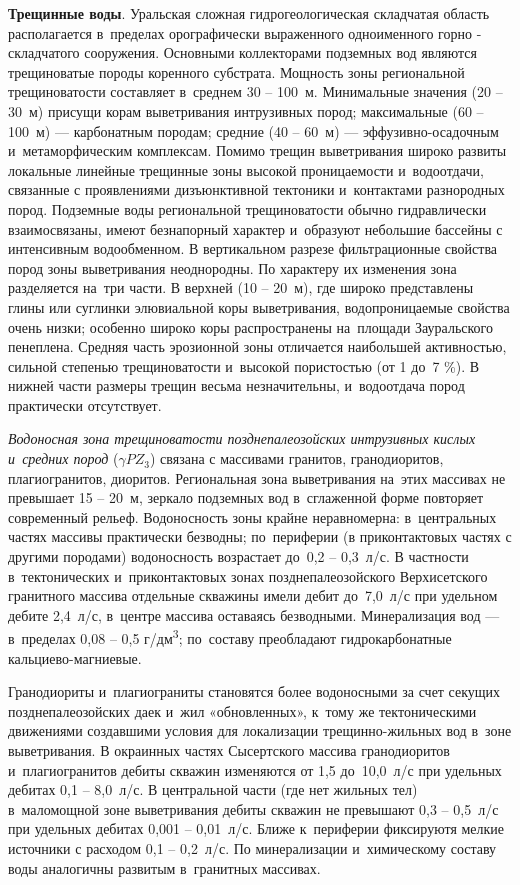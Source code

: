\textbf{Трещинные воды}. Уральская сложная гидрогеологическая складчатая область располагается в~пределах орографически выраженного одноименного горно - складчатого сооружения. Основными коллекторами подземных вод являются трещиноватые породы коренного субстрата. Мощность зоны региональной трещиноватости составляет в~среднем 30  --  100~м. Минимальные значения (20  --  30~м) присущи корам выветривания интрузивных пород; максимальные (60  --  100~м)  ---  карбонатным породам; средние (40  --  60~м)  ---  эффузивно-осадочным и~метаморфическим комплексам. Помимо трещин выветривания широко развиты локальные линейные трещинные зоны высокой проницаемости и~водоотдачи, связанные с проявлениями дизъюнктивной тектоники и~контактами разнородных пород. Подземные воды региональной трещиноватости обычно гидравлически взаимосвязаны, имеют безнапорный характер и~образуют небольшие бассейны с интенсивным
водообменном. В вертикальном разрезе фильтрационные свойства пород зоны выветривания неоднородны. По характеру их изменения зона разделяется на~три части. В верхней (10  --  20~м), где широко представлены глины или суглинки элювиальной коры выветривания, водопроницаемые свойства очень низки; особенно широко коры распространены на~площади Зауральского пенеплена. Средняя часть эрозионной зоны отличается наибольшей активностью, сильной степенью трещиноватости и~высокой пористостью (от 1 до~7 \%). В нижней части размеры трещин весьма незначительны, и~водоотдача пород практически отсутствует.

\textit{Водоносная зона трещиноватости позднепалеозойских интрузивных кислых и~средних пород} ($\gamma PZ_3$) связана с массивами гранитов, гранодиоритов, плагиогранитов, диоритов. Региональная зона выветривания на~этих массивах не превышает 15  --  20~м, зеркало подземных вод в~сглаженной форме повторяет современный рельеф. Водоносность зоны крайне неравномерна: в~центральных частях массивы практически безводны; по~периферии (в приконтактовых частях с другими породами) водоносность возрастает до~0,2  --  0,3~л/с. В частности в~тектонических и~приконтактовых зонах позднепалеозойского Верхисетского гранитного массива отдельные скважины имели дебит до~7,0~л/с при удельном дебите 2,4~л/с, в~центре массива оставаясь безводными. Минерализация вод  ---  в~пределах 0,08 -- 0,5 г/дм\textsuperscript{3}; по~составу преобладают гидрокарбонатные  кальциево-магниевые.

Гранодиориты и~плагиограниты становятся более водоносными за счет секущих позднепалеозойских даек и~жил «обновленных», к~тому же тектоническими движениями создавшими условия для локализации трещинно-жильных вод в~зоне выветривания. В окраинных частях Сысертского массива гранодиоритов и~плагиогранитов дебиты скважин изменяются от 1,5 до~10,0~л/с при удельных дебитах 0,1  --  8,0~л/с. В центральной части (где нет жильных тел) в~маломощной зоне выветривания дебиты скважин не превышают 0,3  --  0,5~л/с при удельных дебитах 0,001 -- 0,01~л/с. Ближе к~периферии фиксируютя мелкие источники с расходом 0,1  --  0,2~л/с. По минерализации и~химическому составу воды аналогичны развитым в~гранитных массивах. 

